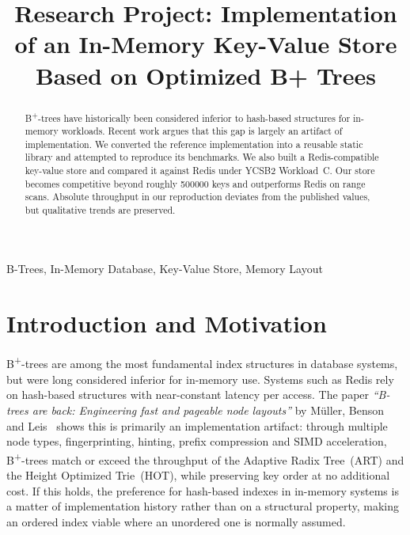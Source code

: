 \documentclass[conference]{IEEEtran}
\begin{document}
\title{Research Project: Implementation of an In-Memory Key-Value Store Based on Optimized B+ Trees}

\author{
}

\maketitle

\begin{abstract}
B\textsuperscript{+}-trees have historically been considered inferior to hash-based structures
for in-memory workloads. Recent work argues that this gap is largely an artifact of
implementation. We converted the reference implementation into a reusable static library
and attempted to reproduce its benchmarks. We also built a Redis-compatible key-value store
and compared it against Redis under YCSB2 Workload~C. Our store becomes competitive beyond
roughly \num{500000} keys and outperforms Redis on range scans. Absolute throughput in our
reproduction deviates from the published values, but qualitative trends are preserved.
\end{abstract}

\begin{IEEEkeywords}
B-Trees, In-Memory Database, Key-Value Store, Memory Layout
\end{IEEEkeywords}

\section{Introduction and Motivation}

B\textsuperscript{+}-trees are among the most fundamental index structures in database
systems, but were long considered inferior for in-memory use. Systems such as Redis rely
on hash-based structures with near-constant latency per access. The paper
\emph{``B-trees are back: Engineering fast and pageable node layouts''} by Müller, Benson
and Leis~\cite{muller2025b} shows this is primarily an implementation artifact: through
multiple node types, fingerprinting, hinting, prefix compression and SIMD acceleration,
B\textsuperscript{+}-trees match or exceed the throughput of the Adaptive Radix Tree~(ART)
and the Height Optimized Trie~(HOT), while preserving key order at no additional cost.
If this holds, the preference for hash-based indexes in in-memory systems is a matter of
implementation history rather than on a structural property, making an ordered index
viable where an unordered one is normally assumed.
\end{document}
